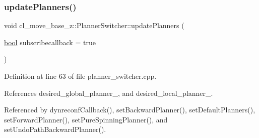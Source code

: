 \subsubsection{\texorpdfstring{update\+Planners()}{updatePlanners()}}
{\footnotesize\ttfamily void cl\+\_\+move\+\_\+base\+\_\+z\+::\+Planner\+Switcher\+::update\+Planners (\begin{DoxyParamCaption}\item[{\hyperlink{classbool}{bool}}]{subscribecallback = {\ttfamily true} }\end{DoxyParamCaption})\hspace{0.3cm}{\ttfamily [private]}}



Definition at line 63 of file planner\+\_\+switcher.\+cpp.



References desired\+\_\+global\+\_\+planner\+\_\+, and desired\+\_\+local\+\_\+planner\+\_\+.



Referenced by dynreconf\+Callback(), set\+Backward\+Planner(), set\+Default\+Planners(), set\+Forward\+Planner(), set\+Pure\+Spinning\+Planner(), and set\+Undo\+Path\+Backward\+Planner().


